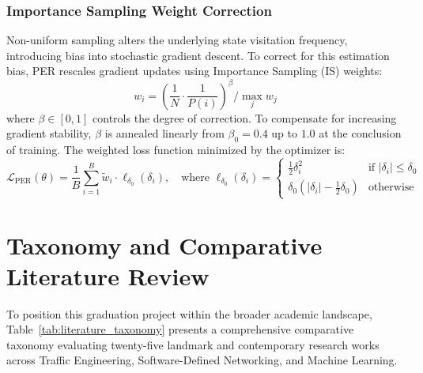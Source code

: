 \subsubsection{Importance Sampling Weight Correction}
Non-uniform sampling alters the underlying state visitation frequency, introducing bias into stochastic gradient descent. To correct for this estimation bias, PER rescales gradient updates using Importance Sampling (IS) weights:
\begin{equation}
    w_i = \left( \frac{1}{N} \cdot \frac{1}{P(i)} \right)^\beta \Big/ \max_{j} w_j
    \label{eq:per_is_weights}
\end{equation}
where $\beta \in [0, 1]$ controls the degree of correction. To compensate for increasing gradient stability, $\beta$ is annealed linearly from $\beta_0 = 0.4$ up to $1.0$ at the conclusion of training. The weighted loss function minimized by the optimizer is:
\begin{equation}
    \mathcal{L}_{\text{PER}}(\theta) = \frac{1}{B} \sum_{i=1}^B \tilde{w}_i \cdot \ell_{\delta_0}(\delta_i), \quad \text{where } \ell_{\delta_0}(\delta_i) = \begin{cases} \frac{1}{2}\delta_i^2 & \text{if } |\delta_i| \le \delta_0 \\ \delta_0 \left( |\delta_i| - \frac{1}{2}\delta_0 \right) & \text{otherwise} \end{cases}
    \label{eq:weighted_huber_loss}
\end{equation}

\section{Taxonomy and Comparative Literature Review}
To position this graduation project within the broader academic landscape, Table~\ref{tab:literature_taxonomy} presents a comprehensive comparative taxonomy evaluating twenty-five landmark and contemporary research works across Traffic Engineering, Software-Defined Networking, and Machine Learning.

